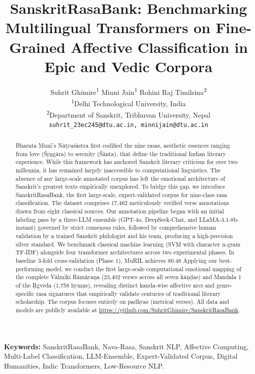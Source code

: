 \documentclass[11pt]{article}
\title{SanskritRasaBank: Benchmarking Multilingual Transformers on
Fine-Grained Affective Classification in Epic and Vedic Corpora}
\author{Suhrit Ghimire\textsuperscript{1}  \quad Minni Jain\textsuperscript{1} 
\quad Rohini Raj Timilsina\textsuperscript{2}\\
  \textsuperscript{1}Delhi Technological University, India \\
  \textsuperscript{2}Department of Sanskrit, Tribhuvan University, Nepal \\
  \texttt{suhrit\_23ec245@dtu.ac.in, minnijain@dtu.ac.in} \\ \url{}}
\begin{document}
\maketitle

\begin{abstract}
Bharata Muni's Nāṭyaśāstra first codified the nine rasas, aesthetic essences ranging from love (Śṛṇgāra) to serenity (Śānta), that define the traditional Indian literary experience. While this framework has anchored Sanskrit literary criticism for over two millennia, it has remained largely inaccessible to computational linguistics. The absence of any large-scale annotated corpus has left the emotional architecture of Sanskrit's greatest texts empirically unexplored.
To bridge this gap, we introduce SanskritRasaBank, the first large-scale, expert-validated corpus for nine-class rasa classification. The dataset comprises 17,462 meticulously verified verse annotations drawn from eight classical sources. Our annotation pipeline began with an initial labeling pass by a three-LLM ensemble (GPT-4o, DeepSeek-Chat, and LLaMA-3.1-8b-instant) governed by strict consensus rules, followed by comprehensive human validation by a trained Sanskrit philologist and his team, producing a high-precision silver standard.
We benchmark classical machine learning (SVM with character n-gram TF-IDF) alongside four transformer architectures across two experimental phases. In baseline 3-fold cross-validation (Phase 1), MuRIL achieves 80.48%
Applying our best-performing model, we conduct the first large-scale computational emotional mapping of the complete Vālmīki Rāmāyaṇa (23,402 verses across all seven kāṇḍas) and Mandala 1 of the Ṛgveda (1,758 hymns), revealing distinct kanda-wise affective arcs and genre-specific rasa signatures that empirically validate centuries of traditional literary scholarship. The corpus focuses entirely on padhyas (metrical verses). All data and models are publicly available at \url{https://github.com/SuhritGhimire/SanskritRasaBank}.
\end{abstract}

\vspace{0.5em}
\noindent \textbf{Keywords:} SanskritRasaBank, Nava-Rasa, Sanskrit NLP, Affective Computing, Multi-Label Classification, LLM-Ensemble, Expert-Validated Corpus, Digital Humanities, Indic Transformers, Low-Resource NLP.
\end{document}
